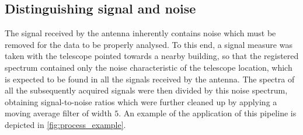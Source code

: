 \subsection{Distinguishing signal and noise}
The signal received by the antenna inherently contains noise which must be removed for the data to be properly analysed.
To this end, a signal measure was taken with the telescope pointed towards a nearby building, so that the registered spectrum  contained only the noise characteristic of the telescope location, which is expected to be found in all the signals received by the antenna.
The spectra of all the subsequently acquired signals were then divided by this noise spectrum, obtaining  signal-to-noise ratios which were further cleaned up by applying a moving average filter of width $5$.
An example of the application of this pipeline is depicted in \autoref{fig:process_example}.

